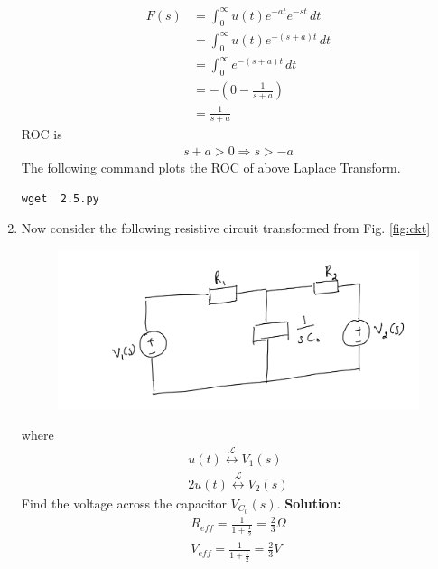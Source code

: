 \documentclass[journal,12pt,twocolumn]{IEEEtran}
\newcommand{\solution}{\noindent \textbf{Solution: }}
\providecommand{\brak}[1]{\ensuremath{\left(#1\right)}}
\providecommand{\system}[1]{\overset{\mathcal{#1}}{ \longleftrightarrow}}
\numberwithin{equation}{section}
\renewcommand\thesection{\arabic{section}}
\begin{document}
\begin{enumerate}[label=\arabic*.,ref=\thesection.\theenumi]
\begin{align}
		F(s)&=\int_{0}^{\infty} u(t)e^{-at}e^{-st} \,dt\\
		&=\int_{0}^{\infty} u(t)e^{-\brak{s+a}t} \,dt\\
		&=\int_{0}^{\infty} e^{-\brak{s+a}t} \,dt\\
		&=-\brak{0-\frac{1}{s+a}}\\
		&=\frac{1}{s+a}
		\end{align}
		ROC is
		\begin{align}
		s+a>0 \Rightarrow s>-a
		\end{align}
		The following command plots the ROC of above Laplace Transform.
	\begin{lstlisting}
wget  2.5.py	
\end{lstlisting}
		\begin{figure}[!ht]
			\centering
			\caption{}
			\label{fig:roc2}
\end{figure}
	\item Now consider the following resistive circuit transformed from 
			Fig. \ref{fig:ckt}
		\begin{figure}[!ht]
			\centering
			\includegraphics[width=\columnwidth]{figs/lap-ckt.jpg}
			\caption{}
			\label{fig:lap-ckt}
\end{figure}
		where 
		\begin{align}
			u(t) \system{L} V_1(s)
			\\
			2u(t) \system{L} V_2(s)
		\end{align}
		Find the voltage across the capacitor $V_{C_0}(s)$.
		\solution
		\begin{align}
		R_{eff}=\frac{1}{1+\frac{1}{2}}
		=\frac{2}{3} \Omega\\
		V_{eff}=\frac{1}{1+\frac{1}{2}}
		=\frac{2}{3} V
		\end{align}
	

\end{enumerate}
\end{document}
